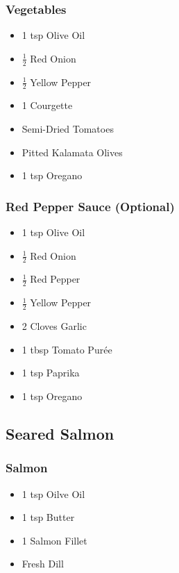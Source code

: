 \documentclass[11pt, english]{article}
\begin{document}
		\subsubsection*{Vegetables}

	\begin{itemize}
        \setlength\itemsep{0cm}
                \item 1 tsp Olive Oil
		\item $\frac{1}{2}$ Red Onion
		\item $\frac{1}{2}$ Yellow Pepper
		\item 1 Courgette
		\item Semi-Dried Tomatoes
		\item Pitted Kalamata Olives
		\item 1 tsp Oregano
        \end{itemize}

		\subsubsection*{Red Pepper Sauce (Optional)}
		
	\begin{itemize}
        \setlength\itemsep{0cm}
                \item 1 tsp Olive Oil
		\item $\frac{1}{2}$ Red Onion
		\item $\frac{1}{2}$ Red Pepper
		\item $\frac{1}{2}$ Yellow Pepper
		\item 2 Cloves Garlic
		\item 1 tbsp Tomato Pur\'{e}e
		\item 1 tsp Paprika
		\item 1 tsp Oregano
        \end{itemize}

\newpage

	\subsection{Seared Salmon}

		\subsubsection*{Salmon}

	\begin{itemize}
        \setlength\itemsep{0cm}
                \item 1 tsp Oilve Oil
		\item 1 tsp Butter
		\item 1 Salmon Fillet
		\item Fresh Dill
        \end{itemize}
\end{document}
